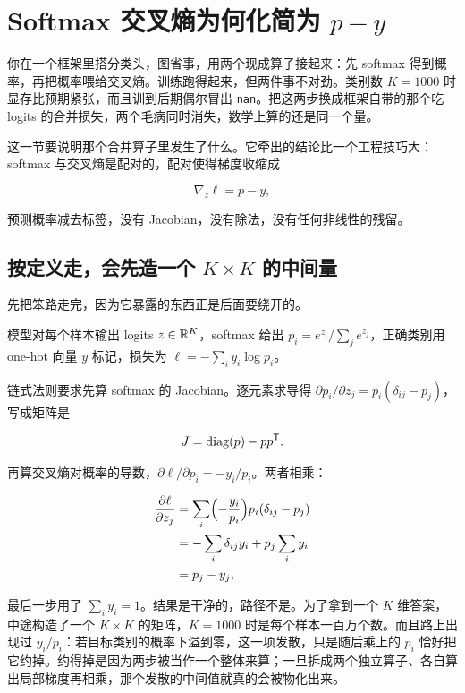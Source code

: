 \section{\texorpdfstring{Softmax 交叉熵为何化简为 \(p-y\)}{Softmax 交叉熵为何化简为 p-y}}
\label{sec:10-Matrix-Calculus/04-Applications/02}

你在一个框架里搭分类头，图省事，用两个现成算子接起来：先 softmax 得到概率，再把概率喂给交叉熵。训练跑得起来，但两件事不对劲。类别数 \(K=1000\) 时显存比预期紧张，而且训到后期偶尔冒出 \texttt{nan}。把这两步换成框架自带的那个吃 logits 的合并损失，两个毛病同时消失，数学上算的还是同一个量。

这一节要说明那个合并算子里发生了什么。它牵出的结论比一个工程技巧大：softmax 与交叉熵是配对的，配对使得梯度收缩成

\[
\nabla_z\ell=p-y,
\]

预测概率减去标签，没有 Jacobian，没有除法，没有任何非线性的残留。

\subsection{按定义走，会先造一个 \texorpdfstring{\(K\times K\)}{K 乘 K} 的中间量}

先把笨路走完，因为它暴露的东西正是后面要绕开的。

模型对每个样本输出 logits \(z\in\mathbb{R}^K\)，softmax 给出 \(p_i=e^{z_i}/\sum_je^{z_j}\)，正确类别用 one-hot 向量 \(y\) 标记，损失为 \(\ell=-\sum_iy_i\log p_i\)。

链式法则要求先算 softmax 的 Jacobian。逐元素求导得 \(\partial p_i/\partial z_j=p_i(\delta_{ij}-p_j)\)，写成矩阵是

\[
J=\operatorname{diag}(p)-pp^{\mathsf{T}}.
\]

再算交叉熵对概率的导数，\(\partial\ell/\partial p_i=-y_i/p_i\)。两者相乘：

\[
\begin{aligned}
\frac{\partial\ell}{\partial z_j}
&=\sum_i\Bigl(-\frac{y_i}{p_i}\Bigr)p_i(\delta_{ij}-p_j)\\
&=-\sum_i\delta_{ij}y_i+p_j\sum_iy_i\\
&=p_j-y_j,
\end{aligned}
\]

最后一步用了 \(\sum_iy_i=1\)。结果是干净的，路径不是。为了拿到一个 \(K\) 维答案，中途构造了一个 \(K\times K\) 的矩阵，\(K=1000\) 时是每个样本一百万个数。而且路上出现过 \(y_i/p_i\)：若目标类别的概率下溢到零，这一项发散，只是随后乘上的 \(p_i\) 恰好把它约掉。约得掉是因为两步被当作一个整体来算；一旦拆成两个独立算子、各自算出局部梯度再相乘，那个发散的中间值就真的会被物化出来。

